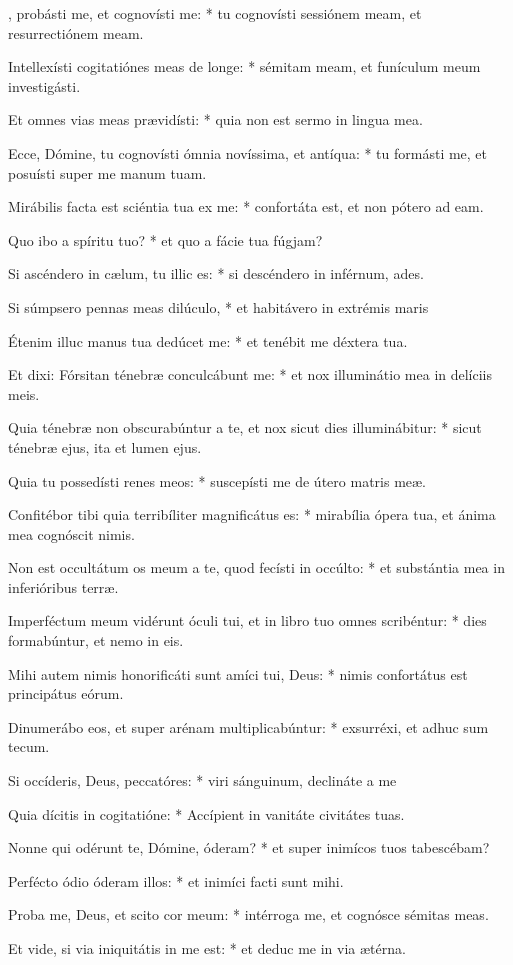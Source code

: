 \begin{psalmus}
    
    , probásti me, et cognovísti me: * tu cognovísti sessiónem meam, et resurrectiónem meam.
    
    Intellexísti cogitatiónes meas de longe: * sémitam meam, et funículum meum investigásti.
    
    Et omnes vias meas prævidísti: * quia non est sermo in lingua mea.
    
    Ecce, Dómine, tu cognovísti ómnia novíssima, et antíqua: * tu formásti me, et posuísti super me manum tuam.
    
    Mirábilis facta est sciéntia tua ex me: * confortáta est, et non pótero ad eam.
    
    Quo ibo a spíritu tuo? * et quo a fácie tua fúgjam?
    
    Si ascéndero in cælum, tu illic es: * si descéndero in inférnum, ades.
    
    Si súmpsero pennas meas dilúculo, * et habitávero in extrémis maris
    
    Étenim illuc manus tua dedúcet me: * et tenébit me déxtera tua.
    
    Et dixi: Fórsitan ténebræ conculcábunt me: * et nox illuminátio mea in delíciis meis.
    
    Quia ténebræ non obscurabúntur a te, et nox sicut dies illuminábitur: * sicut ténebræ ejus, ita et lumen ejus.
    
    Quia tu possedísti renes meos: * suscepísti me de útero matris meæ.
    
    Confitébor tibi quia terribíliter magnificátus es: * mirabília ópera tua, et ánima mea cognóscit nimis.
    
    Non est occultátum os meum a te, quod fecísti in occúlto: * et substántia mea in inferióribus terræ.
    
    Imperféctum meum vidérunt óculi tui, et in libro tuo omnes scribéntur: * dies formabúntur, et nemo in eis.
    
    Mihi autem nimis honorificáti sunt amíci tui, Deus: * nimis confortátus est principátus eórum.
    
    Dinumerábo eos, et super arénam multiplicabúntur: * exsurréxi, et adhuc sum tecum.
    
    Si occíderis, Deus, peccatóres: * viri sánguinum, declináte a me
    
    Quia dícitis in cogitatióne: * Accípient in vanitáte civitátes tuas.
    
    Nonne qui odérunt te, Dómine, óderam? * et super inimícos tuos tabescébam?
    
    Perfécto ódio óderam illos: * et inimíci facti sunt mihi.
    
    Proba me, Deus, et scito cor meum: * intérroga me, et cognósce sémitas meas.
    
    Et vide, si via iniquitátis in me est: * et deduc me in via ætérna.
    
    \end{psalmus}
